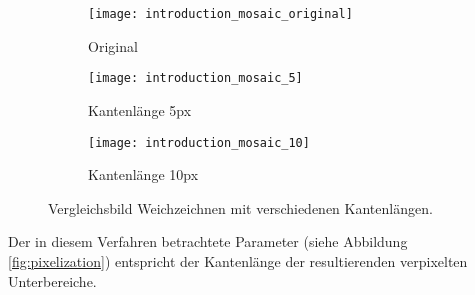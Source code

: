 \begin{figure}[h]
    \centering
    \begin{subfigure}{0.3\textwidth}
        \texttt{[image: introduction\_mosaic\_original]}
        \caption{\tiny Original}
    \end{subfigure}
    \begin{subfigure}{0.3\textwidth}
        \texttt{[image: introduction\_mosaic\_5]}
        \caption{\tiny Kantenlänge 5px}
    \end{subfigure}
    \begin{subfigure}{0.3\textwidth}
        \texttt{[image: introduction\_mosaic\_10]}
        \caption{\tiny Kantenlänge 10px}
    \end{subfigure}

    \caption{Vergleichsbild Weichzeichnen mit verschiedenen Kantenlängen.}
    \label{fig:pixelization}
\end{figure}

Der in diesem Verfahren betrachtete Parameter (siehe Abbildung \vref*{fig:pixelization}) entspricht der Kantenlänge der
resultierenden verpixelten Unterbereiche.
